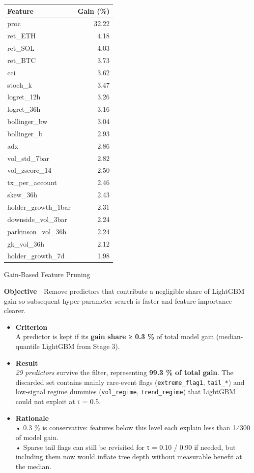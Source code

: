 \documentclass[
  a4paper,
  DIV=11,
  numbers=noendperiod]{scrreprt}
\begin{document}
\begin{longtable}[]{@{}lr@{}}
\toprule\noalign{}
Feature & Gain (\%) \\
\midrule\noalign{}
\endhead
\bottomrule\noalign{}
\endlastfoot
proc & 32.22 \\
ret\_ETH & 4.18 \\
ret\_SOL & 4.03 \\
ret\_BTC & 3.73 \\
cci & 3.62 \\
stoch\_k & 3.47 \\
logret\_12h & 3.26 \\
logret\_36h & 3.16 \\
bollinger\_bw & 3.04 \\
bollinger\_b & 2.93 \\
adx & 2.86 \\
vol\_std\_7bar & 2.82 \\
vol\_zscore\_14 & 2.50 \\
tx\_per\_account & 2.46 \\
skew\_36h & 2.43 \\
holder\_growth\_1bar & 2.31 \\
downside\_vol\_3bar & 2.24 \\
parkinson\_vol\_36h & 2.24 \\
gk\_vol\_36h & 2.12 \\
holder\_growth\_7d & 1.98 \\
\end{longtable}

Gain-Based Feature Pruning

\textbf{Objective} Remove predictors that contribute a negligible share
of LightGBM gain so subsequent hyper-parameter search is faster and
feature importance clearer.

\begin{itemize}
\item
  \textbf{Criterion}\\
  A predictor is kept if its \textbf{gain share ≥ 0.3 \%} of total model
  gain (median-quantile LightGBM from Stage 3).
\item
  \textbf{Result}\\
  \emph{29 predictors} survive the filter, representing \textbf{99.3 \%
  of total gain}. The discarded set contains mainly rare-event flags
  (\texttt{extreme\_flag1}, \texttt{tail\_*}) and low-signal regime
  dummies (\texttt{vol\_regime}, \texttt{trend\_regime}) that LightGBM
  could not exploit at τ = 0.5.
\item
  \textbf{Rationale}\\
  • 0.3 \% is conservative: features below this level each explain less
  than 1⁄300 of model gain.\\
  • Sparse tail flags can still be revisited for τ = 0.10 / 0.90 if
  needed, but including them now would inflate tree depth without
  measurable benefit at the median.
\end{itemize}
\end{document}
